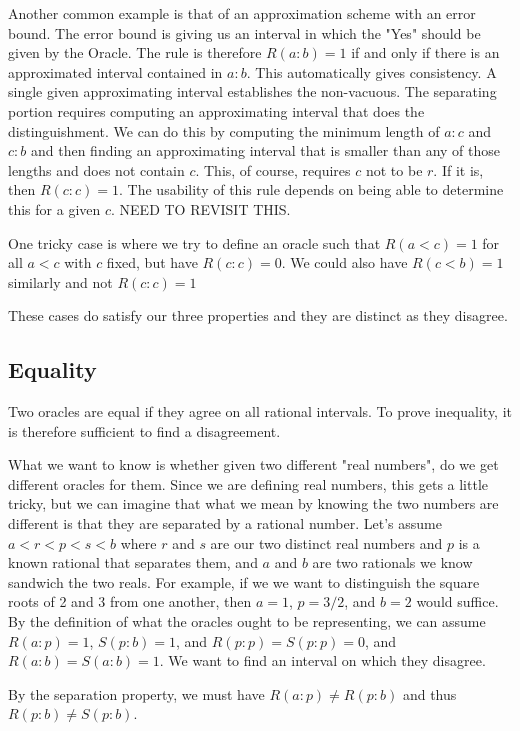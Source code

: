 \documentclass[12pt]{article}
\theoremstyle{remark}
\begin{document}
Another common example is that of an approximation scheme with an error bound. The error bound is giving us an interval in which the "Yes" should be given by the Oracle. The rule is therefore $R(a:b) = 1$ if and only if there is an approximated interval contained in $a:b$. This automatically gives consistency. A single given approximating interval establishes the non-vacuous. The separating portion requires computing an approximating interval that does the distinguishment. We can do this by computing the minimum length of $a:c$ and $c:b$ and then finding an approximating interval that is smaller than any of those lengths and does not contain $c$. This, of course, requires $c$ not to be $r$. If it is, then $R(c:c) = 1$. The usability of this rule depends on being able to determine this for a given $c$. NEED TO REVISIT THIS. 

One tricky case is where we try to define an oracle such that $R(a<c) = 1$ for all $a < c$ with $c$ fixed, but have $R(c:c) = 0$. We could also have $R(c<b) =1$ similarly and not $R(c:c) =1$

These cases do satisfy our three properties and they are distinct as they disagree. 

\subsection{Equality}

Two oracles are equal if they agree on all rational intervals. To prove inequality, it is therefore sufficient to find a disagreement. 

What we want to know is whether given two different "real numbers", do we get different oracles for them. Since we are defining real numbers, this gets a little tricky, but we can imagine that what we mean by knowing the two numbers are different is that they are separated by a rational number. Let's assume $a < r < p < s < b$ where $r$ and $s$ are our two distinct real numbers and $p$ is a known rational that separates them, and $a$ and $b$ are two rationals we know sandwich the two reals. For example, if we we want to distinguish the square roots of 2 and 3 from one another, then $a = 1$, $p = 3/2$, and $b = 2$ would suffice. By the definition of what the oracles ought to be representing, we can assume $R(a:p) = 1$, $S(p:b) = 1$, and $R(p:p) = S(p:p) = 0$, and $R(a:b)=S(a:b) = 1$. We want to find an interval on which they disagree. 

By the separation property, we must have $R(a:p) \neq R(p:b)$ and thus $R(p:b) \neq S(p:b)$. 
\end{document}
